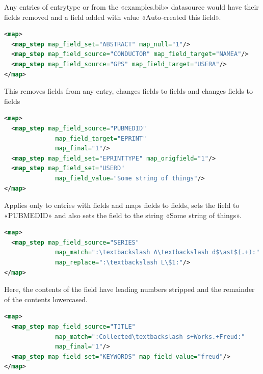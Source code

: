 \documentclass{ltxdockit}
\begin{document}
\noindent Any entries of entrytype  or  from the
«examples.bib» datasource would have their 
fields removed and a  field added with value «Auto-created this field».

\begin{lstlisting}[language=xml,escapechar=:,mathescape=true]
<map>
  <map_step map_field_set="ABSTRACT" map_null="1"/>
  <map_step map_field_source="CONDUCTOR" map_field_target="NAMEA"/>
  <map_step map_field_source="GPS" map_field_target="USERA"/>
</map>
\end{lstlisting}

\noindent This removes  fields from any entry, changes
 fields to  fields and changes 
fields to  fields

\begin{lstlisting}[language=xml,escapechar=:,mathescape=true]
<map>
  <map_step map_field_source="PUBMEDID"
              map_field_target="EPRINT"
              map_final="1"/>
  <map_step map_field_set="EPRINTTYPE" map_origfield="1"/>
  <map_step map_field_set="USERD"
              map_field_value="Some string of things"/>
</map>
\end{lstlisting}

\noindent Applies only to entries with  fields and maps
 fields to  fields, sets the 
field to «PUBMEDID» and also sets the  field to the string
«Some string of things».

\begin{lstlisting}[language=xml,escapechar=:,mathescape=true]
<map>
  <map_step map_field_source="SERIES"
              map_match=":\textbackslash A\textbackslash d$\ast$(.+):"
              map_replace=":\textbackslash L\$1:"/>
</map>
\end{lstlisting}

\noindent Here, the contents of the 
field have leading numbers stripped and the remainder of the contents
lowercased.

\begin{lstlisting}[language=xml,escapechar=:,mathescape=true]
<map>
  <map_step map_field_source="TITLE"
              map_match=":Collected\textbackslash s+Works.+Freud:"
              map_final="1"/>
  <map_step map_field_set="KEYWORDS" map_field_value="freud"/>
</map>
\end{lstlisting}
\end{document}
